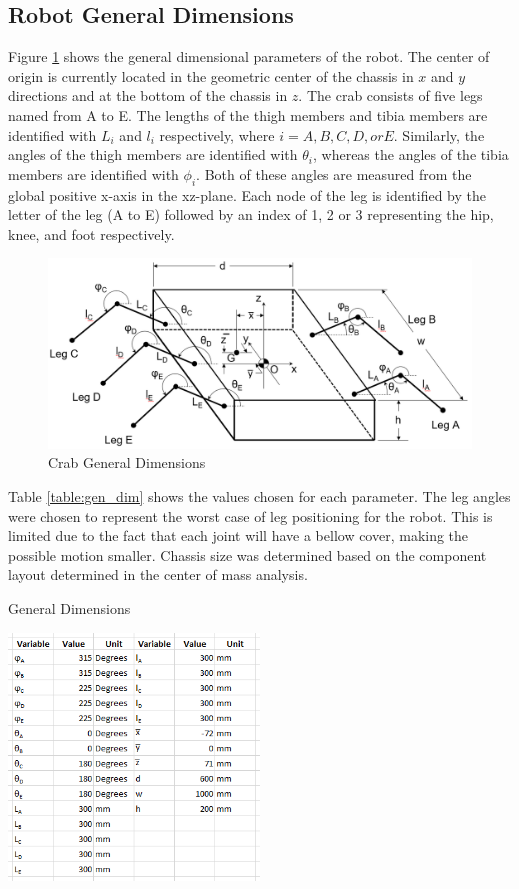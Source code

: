 \subsection{Robot General Dimensions}

Figure \ref{fig:crab_dim} shows the general dimensional parameters of the robot. The center of origin is currently located in the geometric center of the chassis in $x$ and $y$ directions and at the bottom of the chassis in $z$. The crab consists of five legs named from A to E. The lengths of the thigh members and tibia members are identified with $L_{i}$ and $l_{i}$ respectively, where $i = A, B, C, D, or E$. Similarly, the angles of the thigh members are identified with $\theta_{i}$, whereas the angles of the tibia members are identified with $\phi_{i}$. Both of these angles are measured from the global positive x-axis in the xz-plane. Each node of the leg is identified by the letter of the leg (A to E) followed by an index of 1, 2 or 3 representing the hip, knee, and foot respectively.

\begin{figure}
    \centering
    \includegraphics[width=\textwidth]{4_ComponentProperties/img/robot_dimensions.PNG}
    \caption{Crab General Dimensions}
    \label{fig:crab_dim}
\end{figure}

Table \ref{table:gen_dim} shows the values chosen for each parameter. The leg angles were chosen to represent the worst case of leg positioning for the robot. This is limited due to the fact that each joint will have a bellow cover, making the possible motion smaller. Chassis size was determined based on the component layout determined in the center of mass analysis.

\begin{table}[H]
\centering
  \caption{General Dimensions}
  \label{table:gen_dim}
  \includegraphics[width=0.5\textwidth]{4_ComponentProperties/img/GeneralDimensions.PNG}
\end{table}


